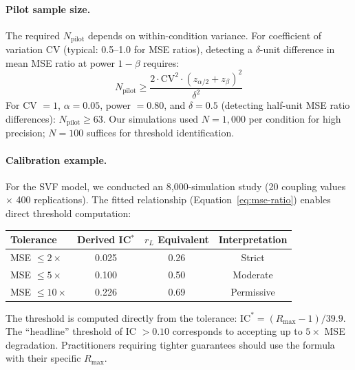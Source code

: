 \documentclass[10pt]{article} %
\theoremstyle{plain}
\theoremstyle{definition}
\newcommand{\IC}{\mathrm{IC}}  %
\begin{document}
\paragraph{Pilot sample size.} The required $N_{\text{pilot}}$ depends on within-condition variance. For coefficient of variation CV (typical: 0.5--1.0 for MSE ratios), detecting a $\delta$-unit difference in mean MSE ratio at power $1 - \beta$ requires:
\begin{equation}
N_{\text{pilot}} \geq \frac{2 \cdot \text{CV}^2 \cdot (z_{\alpha/2} + z_\beta)^2}{\delta^2}
\end{equation}
For CV $= 1$, $\alpha = 0.05$, power $= 0.80$, and $\delta = 0.5$ (detecting half-unit MSE ratio differences): $N_{\text{pilot}} \geq 63$. Our simulations used $N = 1{,}000$ per condition for high precision; $N = 100$ suffices for threshold identification.

\paragraph{Calibration example.} For the SVF model, we conducted an 8,000-simulation study (20 coupling values $\times$ 400 replications). The fitted relationship (Equation~\ref{eq:mse-ratio}) enables direct threshold computation:

\begin{center}
\begin{tabular}{lccc}
\toprule
\textbf{Tolerance} & \textbf{Derived IC$^*$} & \textbf{$r_L$ Equivalent} & \textbf{Interpretation} \\
\midrule
MSE $\leq 2\times$ & 0.025 & 0.26 & Strict \\
MSE $\leq 5\times$ & 0.100 & 0.50 & Moderate \\
MSE $\leq 10\times$ & 0.226 & 0.69 & Permissive \\
\bottomrule
\end{tabular}
\end{center}

The threshold is computed directly from the tolerance: $\IC^* = (R_{\max} - 1)/39.9$. The ``headline'' threshold of IC $> 0.10$ corresponds to accepting up to $5\times$ MSE degradation. Practitioners requiring tighter guarantees should use the formula with their specific $R_{\max}$.
\end{document}

